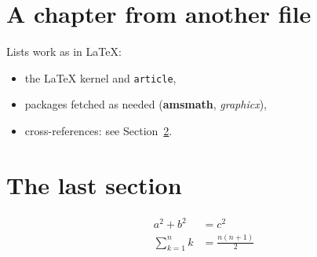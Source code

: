 \section{A chapter from another file}
Lists work as in LaTeX:
\begin{itemize}
  \item the \LaTeX{} kernel and \texttt{article},
  \item packages fetched as needed (\textbf{amsmath}, \emph{graphicx}),
  \item cross-references: see Section~\ref{sec:last}.
\end{itemize}

\section{The last section}\label{sec:last}
\begin{align}
  a^2 + b^2 &= c^2 \\
  \sum_{k=1}^{n} k &= \frac{n(n+1)}{2}
\end{align}
